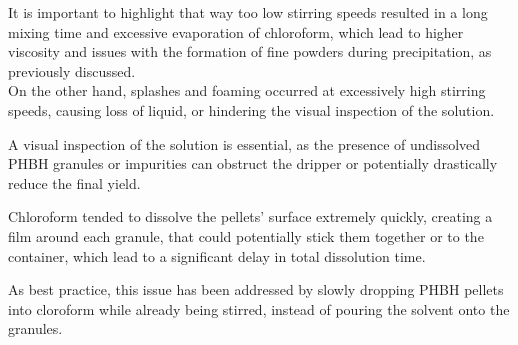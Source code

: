 \documentclass[a4paper]{article}
\begin{document}
        It is important to highlight that way too low stirring speeds resulted in a long mixing time and excessive evaporation of chloroform, which lead to 
        higher viscosity and issues with the formation of fine powders during precipitation, as previously discussed. \\ 

        On the other hand, splashes and foaming occurred at excessively high stirring speeds, causing loss of liquid, or
        hindering the visual inspection of the solution. 

        A visual inspection of the solution is essential, as the presence of undissolved PHBH granules or impurities can 
        obstruct the dripper or potentially drastically reduce the final yield. 

        Chloroform tended to dissolve the pellets' surface extremely quickly, creating a film around each granule, that could potentially stick 
        them together or to the container, which lead to a significant delay in total dissolution time. 

        As best practice, this issue has been addressed by slowly dropping PHBH pellets into cloroform while already being stirred, instead of pouring 
        the solvent onto the granules. \\ 

%
%
%
%
%
%
%
\end{document}
